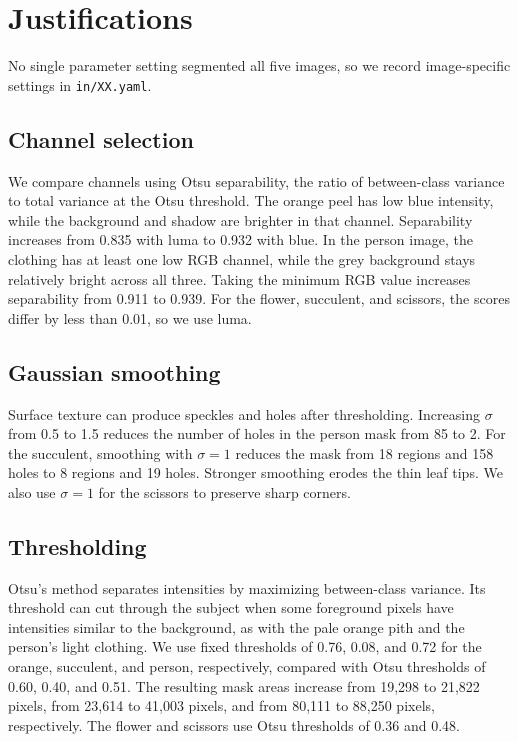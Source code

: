 \documentclass[conference]{IEEEtran}
\begin{document}
\section{Justifications}
\label{sec:justifications}
No single parameter setting segmented all five images, so we record
image-specific settings in \texttt{in/XX.yaml}.

\subsection{Channel selection}
We compare channels using Otsu separability, the ratio of between-class
variance to total variance at the Otsu threshold. The orange peel has low
blue intensity, while the background and shadow are brighter in that
channel. Separability increases from 0.835 with luma to 0.932 with blue.
In the person image, the clothing has at least one low RGB channel, while
the grey background stays relatively bright across all three. Taking the
minimum RGB value increases separability from 0.911 to 0.939. For the
flower, succulent, and scissors, the scores differ by less than 0.01,
so we use luma.

\subsection{Gaussian smoothing}
Surface texture can produce speckles and holes after thresholding.
Increasing $\sigma$ from 0.5 to 1.5 reduces the number of holes in the
person mask from 85 to 2. For the succulent, smoothing with $\sigma=1$
reduces the mask from 18 regions and 158 holes to 8 regions and 19 holes.
Stronger smoothing erodes the thin leaf tips. We also use $\sigma=1$ for
the scissors to preserve sharp corners.

\subsection{Thresholding}
Otsu's method separates intensities by maximizing between-class variance.
Its threshold can cut through the subject when some foreground pixels
have intensities similar to the background, as with the pale orange pith
and the person's light clothing. We use fixed thresholds of 0.76, 0.08,
and 0.72 for the orange, succulent, and person, respectively, compared
with Otsu thresholds of 0.60, 0.40, and 0.51. The resulting mask areas
increase from 19,298 to 21,822 pixels, from 23,614 to 41,003 pixels, and
from 80,111 to 88,250 pixels, respectively. The flower and scissors use
Otsu thresholds of 0.36 and 0.48.
\end{document}
